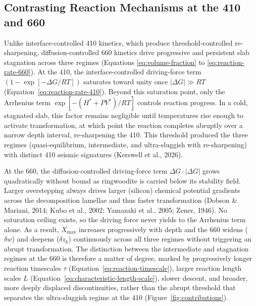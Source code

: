 \documentclass[draft,linenumbers]{agujournal2019}
\begin{document}
\subsection{Contrasting Reaction Mechanisms at the 410 and
660}\label{sec:contrasting-reaction-mechanisms-at-the-410-and-660}

Unlike interface-controlled 410 kinetics, which produce
threshold-controlled re-sharpening, diffusion-controlled 660 kinetics
drive progressive and persistent slab stagnation across three regimes
(Equations \ref{eq:volume-fraction} to \ref{eq:reaction-rate-660}). At
the 410, the interface-controlled driving-force term
\((1 - \exp[-\Delta G / RT])\) saturates toward unity once
\(|\Delta G| \gg RT\) (Equation~\ref{eq:reaction-rate-410}). Beyond this
saturation point, only the Arrhenius term
\(\exp[-(H^\ast + PV^\ast)/RT]\) controls reaction progress. In a cold,
stagnated slab, this factor remains negligible until temperatures rise
enough to activate transformation, at which point the reaction completes
abruptly over a narrow depth interval, re-sharpening the 410. This
threshold produced the three regimes (quasi-equilibrium, intermediate,
and ultra-sluggish with re-sharpening) with distinct 410 seismic
signatures (Kerswell et al., 2026).

At the 660, the diffusion-controlled driving-force term
\(\Delta G \cdot |\Delta G|\) grows quadratically without bound as
ringwoodite is carried below its stability field. Larger overstepping
always drives larger (silicon) chemical potential gradients across the
decomposition lamellae and thus faster transformation (Dobson \&
Mariani, 2014; Kubo et al., 2002; Yamazaki et al., 2005; Zener, 1946).
No saturation ceiling exists, so the driving force never yields to the
Arrhenius term alone. As a result, \(\dot{X}_\mathrm{max}\) increases
progressively with depth and the 660 widens (\(\delta w\)) and deepens
(\(\delta z_k\)) continuously across all three regimes without
triggering an abrupt transformation. The distinction between the
intermediate and stagnation regimes at the 660 is therefore a matter of
degree, marked by progressively longer reaction timescales \(\tau\)
(Equation~\ref{eq:reaction-timescale}), larger reaction length scales
\(L\) (Equation~\ref{eq:characteristic-length-scale}), slower descent,
and broader, more deeply displaced discontinuities, rather than the
abrupt threshold that separates the ultra-sluggish regime at the 410
(Figure~\ref{fig:contributions}).
\end{document}
